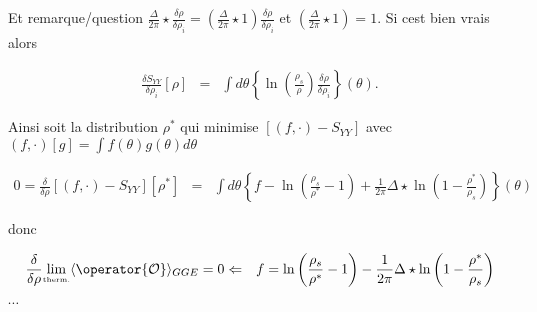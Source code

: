 	
	\begin{aff}
		Et remarque/question $  \frac{ \Delta}{2 \pi} \star \frac{\delta \rho }{ \delta \rho_i } = \left (\frac{ \Delta}{2 \pi} \star  1 \right ) \frac{\delta \rho }{ \delta \rho_i } $ et $\left (\frac{ \Delta}{2 \pi} \star  1 \right ) = 1 $. Si cest bien vrais alors 
	
		\begin{eqnarray}
			\frac{ \delta S_{YY} }{ \delta \rho_i } [\rho ]  & = & \int d \theta \left \{ \ln \left ( \frac{ \rho_s}{ \rho}\right )\frac{\delta \rho }{ \delta \rho_i } \right \}( \theta )	.	
		\end{eqnarray}	
	\end{aff}

	

	
	

	
	Ainsi soit la distribution $\rho^\ast$ qui minimise $\left [ (   f ,  \cdot  )  - S_{YY}  \right ]$ avec $(   f ,  \cdot  )[g] =  \int  f(\theta) g(\theta )  d\theta$
	 
	
	\begin{eqnarray}
		0 = \frac{\delta}{\delta \rho} \left [ (   f ,  \cdot  )  - S_{YY}  \right ][\rho^\ast ] & = & 	\int  d\theta\left \{ f - \ln \left ( \frac{ \rho_s}{ \rho^\ast } - 1 \right ) + \frac{1}{2 \pi} \Delta \star \ln \left ( 1 - \frac{ \rho^\ast }{ \rho_s}\right )  \right \} (\theta )
	\end{eqnarray}
	
	
	
	donc 
	
	\begin{eqnarray} 
		\frac{\delta}{\delta \rho}	\underset{\mbox{\tiny therm.}}{\lim} \langle \operator{\mathcal{O}}\rangle_{GGE} = 0 & \Leftarrow & f = \ln \left ( \frac{ \rho_s}{ \rho^\ast } - 1 \right ) - \frac{1}{2 \pi} \Delta \star \ln \left ( 1 - \frac{ \rho^\ast }{ \rho_s}\right )		
	\end{eqnarray}
	
 
	
	{\color{red} $\cdots$}\\
	
